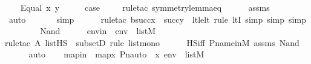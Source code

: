 \begin{isabellebody}
\isanewline
\ \ \isamarkupfalse%
\ {\isacharparenleft}{\kern0pt}Equal\ x\ y{\isacharparenright}{\kern0pt}\isanewline
\ \ \isamarkupfalse%
\ \isamarkupfalse%
\ {\isacharquery}{\kern0pt}case\isanewline
\ \ \ \ \isamarkupfalse%
{\isacharparenleft}{\kern0pt}rule{\isacharunderscore}{\kern0pt}tac\ symmetry{\isacharunderscore}{\kern0pt}lemma{\isacharunderscore}{\kern0pt}eq{\isacharparenright}{\kern0pt}\isanewline
\ \ \ \ \isamarkupfalse%
\ assms\isanewline
\ \ \ \ \ \ \ \ \isamarkupfalse%
\ auto{\isacharbrackleft}{\kern0pt}{}{\isacharbrackright}{\kern0pt}\isanewline
\ \ \ \ \ \isamarkupfalse%
\ simp\isanewline
\ \ \ \ \ \isamarkupfalse%
{\isacharparenleft}{\kern0pt}rule{\isacharunderscore}{\kern0pt}tac\ b{\isacharequal}{\kern0pt}{\isachardoublequoteopen}succ{\isacharparenleft}{\kern0pt}x{\isacharparenright}{\kern0pt}\ {\isasymunion}\ succ{\isacharparenleft}{\kern0pt}y{\isacharparenright}{\kern0pt}{\isachardoublequoteclose}\ \ lt{\isacharunderscore}{\kern0pt}le{\isacharunderscore}{\kern0pt}lt{\isacharcomma}{\kern0pt}\ rule\ ltI{\isacharcomma}{\kern0pt}\ simp{\isacharcomma}{\kern0pt}\ simp{\isacharcomma}{\kern0pt}\ simp{\isacharparenright}{\kern0pt}{\isacharplus}{\kern0pt}\isanewline
\ \ \ \ \isamarkupfalse%
\isanewline
{}\isamarkupfalse%
\isanewline
\ \ \isamarkupfalse%
\ {\isacharparenleft}{\kern0pt}Nand\ {\isasymphi}\ {\isasympsi}{\isacharparenright}{\kern0pt}\isanewline
\isanewline
\ \ \isamarkupfalse%
\ envin\ {\isacharcolon}{\kern0pt}\ {\isachardoublequoteopen}env\ {\isasymin}\ list{\isacharparenleft}{\kern0pt}M{\isacharparenright}{\kern0pt}{\isachardoublequoteclose}\ \isanewline
\ \ \ \ \isamarkupfalse%
{\isacharparenleft}{\kern0pt}rule{\isacharunderscore}{\kern0pt}tac\ A{\isacharequal}{\kern0pt}\ {\isachardoublequoteopen}list{\isacharparenleft}{\kern0pt}HS{\isacharparenright}{\kern0pt}{\isachardoublequoteclose}\ \ subsetD{\isacharcomma}{\kern0pt}\ rule\ list{\isacharunderscore}{\kern0pt}mono{\isacharparenright}{\kern0pt}\isanewline
\ \ \ \ \isamarkupfalse%
\ HS{\isacharunderscore}{\kern0pt}iff\ P{\isacharunderscore}{\kern0pt}name{\isacharunderscore}{\kern0pt}in{\isacharunderscore}{\kern0pt}M\ assms\ Nand\isanewline
\ \ \ \ \isamarkupfalse%
\ auto\isanewline
\ \ \isamarkupfalse%
\ mapin\ {\isacharcolon}{\kern0pt}\ {\isachardoublequoteopen}map{\isacharparenleft}{\kern0pt}{\isasymlambda}x{\isachardot}{\kern0pt}\ Pn{\isacharunderscore}{\kern0pt}auto{\isacharparenleft}{\kern0pt}{\isasympi}{\isacharparenright}{\kern0pt}\ {\isacharbackquote}{\kern0pt}\ x{\isacharcomma}{\kern0pt}\ env{\isacharparenright}{\kern0pt}\ {\isasymin}\ list{\isacharparenleft}{\kern0pt}M{\isacharparenright}{\kern0pt}{\isachardoublequoteclose}\ \ \isanewline

\end{isabellebody}

